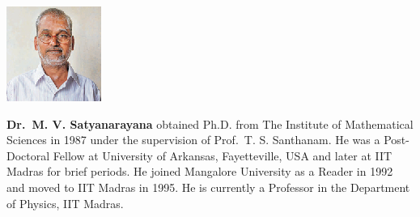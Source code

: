 \centerline{\includegraphics[scale=2.5]{authorsphotos/Prof_M_V_Satyanarayana.eps}}
\smallskip

\medskip

\noindent
\textbf{Dr.\ M. V. Satyanarayana} obtained Ph.D. from The Institute of Mathematical Sciences in 1987 under the supervision of Prof.\ T. S. Santhanam. He was a Post-Doctoral Fellow at University of Arkansas, Fayetteville, USA and later at IIT Madras for brief periods. He joined Mangalore University as a Reader in 1992 and moved to IIT Madras in 1995. He is currently a Professor in the Department of Physics, IIT Madras.
